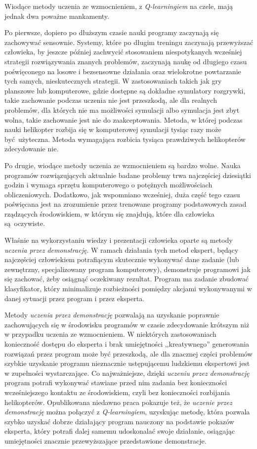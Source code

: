 \documentclass[polish,master,a4paper,oneside]{ppfcmthesis}
\begin{document}
Wiodące metody uczenia ze wzmocnieniem, z \textit{Q-learningiem} na czele, mają jednak dwa poważne mankamenty.

Po pierwsze, dopiero po dłuższym czasie nauki programy zaczynają się zachowywać sensownie. Systemy, które po długim treningu zaczynają przewyższać człowieka, by jeszcze później zachwycić stosowaniem niespotykanych wcześniej strategii rozwiązywania znanych problemów, zaczynają naukę od długiego czasu poświęconego na losowe i bezsensowne działania oraz wielokrotne powtarzanie tych samych, nieskutecznych strategii. W zastosowaniach takich jak gry planszowe lub komputerowe, gdzie dostępne są dokładne symulatory rozgrywki, takie zachowanie podczas uczenia nie jest przeszkodą, ale dla realnych problemów, dla których nie ma możliwości symulacji albo symulacja jest zbyt wolna, takie zachowanie jest nie do zaakceptowania. Metoda, w której podczas nauki helikopter rozbija się w komputerowej symulacji tysiąc razy może być użyteczna. Metoda wymagająca rozbicia tysiąca prawdziwych helikopterów zdecydowanie nie.

Po drugie, wiodące metody uczenia ze wzmocnieniem są bardzo wolne. Nauka programów rozwiązujących aktualnie badane problemy trwa najczęściej dziesiątki godzin i wymaga sprzętu komputerowego o potężnych możliwościach obliczeniowych. Dodatkowo, jak wspomniano wcześniej, duża część tego czasu poświęcana jest na zrozumienie przez trenowane programy podstawowych zasad rządzących środowiskiem, w którym się znajdują, które dla człowieka są oczywiste.

Właśnie na wykorzystaniu wiedzy i prezentacji człowieka oparte są metody \textit{uczenia przez demonstrację}. W ramach działania tych metod ekspert, będący najczęściej człowiekiem potrafiącym skutecznie wykonywać dane zadanie (lub zewnętrzny, specjalizowany program komputerowy), demonstruje programowi jak się zachować, żeby osiągnąć oczekiwany rezultat. Program ma zadanie zbudować klasyfikator, który minimalizuje rozbieżności pomiędzy akcjami wykonywanymi w danej sytuacji przez program i przez eksperta.

Metody \textit{uczenia przez demonstrację} pozwalają na uzyskanie poprawnie zachowujących się w środowisku programów w czasie zdecydowanie krótszym niż w przypadku uczenia ze wzmocnieniem. W niektórych zastosowaniach konieczność dostępu do eksperta i brak umiejętności ,,kreatywnego'' generowania rozwiązań przez program może być przeszkodą, ale dla znacznej części problemów szybkie uzyskanie programu nieznacznie ustępującemu ludzkiemu ekspertowi jest w zupełności wystarczające. Co najważniejsze, dzięki \textit{uczeniu przez demonstrację} program potrafi wykonywać stawiane przed nim zadania bez konieczności wcześniejszego kontaktu ze środowiskiem, czyli bez konieczności rozbijania helikopterów. Opublikowana niedawno praca \cite{DBLP:journals/corr/HesterVPLSPSDOA17} pokazuje też, że \textit{uczenie przez demonstrację} można połączyć z \textit{Q-learningiem}, uzyskując metodę, która pozwala szybko uzyskać dobrze działający program nauczony na podstawie pokazów eksperta, który potrafi dalej samemu udoskonalać swoje działanie, osiągając umiejętności znacznie przewyższające przedstawione demonstracje.
\end{document}
